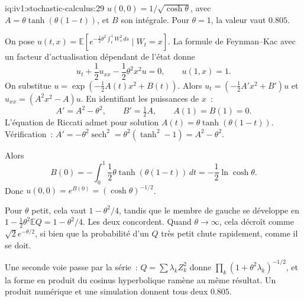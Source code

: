 \begin{solution}{iq:iv1:stochastic-calculus:29}
$u(0, 0) = 1/\sqrt{\cosh\theta}$, avec $A = \theta\tanh(\theta(1 - t))$, et $B$ son intégrale. Pour $\theta = 1$, la valeur vaut $0.805$.

On pose $u(t, x) = \mathbb{E}[e^{-\frac12\theta^2\int_t^1W_s^2\,ds} \mid W_t = x]$. La formule de Feynman--Kac avec un facteur d'actualisation dépendant de l'état donne
\[
u_t + \frac12u_{xx} - \frac12\theta^2x^2u = 0, \qquad u(1, x) = 1.
\]
On substitue $u = \exp(-\frac12A(t)x^2 + B(t))$. Alors $u_t = (-\frac12A'x^2 + B')u$ et $u_{xx} = (A^2x^2 - A)u$. En identifiant les puissances de $x$~:
\[
A' = A^2 - \theta^2, \qquad B' = \tfrac12A, \qquad A(1) = B(1) = 0.
\]
L'équation de Riccati admet pour solution $A(t) = \theta\tanh(\theta(1 - t))$. Vérification~: $A' = -\theta^2\operatorname{sech}^2 = \theta^2(\tanh^2 - 1) = A^2 - \theta^2$.

Alors
\[
B(0) = -\int_0^1\frac12\theta\tanh(\theta(1 - t))\,dt = -\frac12\ln\cosh\theta.
\]
Donc $u(0, 0) = e^{B(0)} = (\cosh\theta)^{-1/2}$.

Pour $\theta$ petit, cela vaut $1 - \theta^2/4$, tandis que le membre de gauche se développe en $1 - \frac12\theta^2\mathbb{E}Q = 1 - \theta^2/4$. Les deux concordent. Quand $\theta \to \infty$, cela décroît comme $\sqrt{2}e^{-\theta/2}$, si bien que la probabilité d'un $Q$ très petit chute rapidement, comme il se doit.

Une seconde voie passe par la série~: $Q = \sum\lambda_kZ_k^2$ donne $\prod_k(1 + \theta^2\lambda_k)^{-1/2}$, et la forme en produit du cosinus hyperbolique ramène au même résultat. Un produit numérique et une simulation donnent tous deux $0.805$.



\end{solution}

